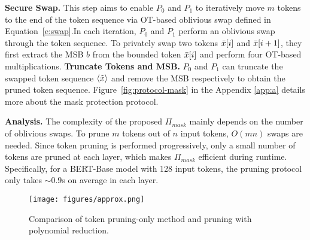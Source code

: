  \textbf{Secure Swap.}  This step aims to enable $P_0$ and $P_1$ to iteratively move $m$ tokens to the end of the token sequence via OT-based oblivious swap defined in Equation~\ref{e:swap}.In each iteration, $P_0$ and $P_1$ perform an oblivious swap through the token sequence. To privately swap two tokens $\Bar{x}[i]$ and $\Bar{x}[i+1]$, they first extract the MSB $b$ from the bounded token $\Bar{x}[i]$ and perform four OT-based multiplications.  \textbf{Truncate Tokens and MSB.} $P_0$ and $P_1$ can truncate the swapped token sequence $\left \langle \Tilde{x} \right \rangle$ and remove the MSB respectively to obtain the pruned token sequence. Figure~\ref{fig:protocol-mask} in the Appendix \ref{app:a} details more about the mask protection protocol. 

\textbf{Analysis.} The complexity of the proposed $\Pi_{mask}$ mainly depends on the number of oblivious swaps. To prune $m$ tokens out of $n$ input tokens, $O(mn)$ swaps are needed. Since token pruning is performed progressively, only a small number of tokens are pruned at each layer, which makes $\Pi_{mask}$ efficient during runtime. Specifically, for a BERT-Base model with 128 input tokens, the pruning protocol only takes $\sim0.9$s on average in each layer. %

\begin{figure*}[h]
 \vspace{-0.1in}
    \centering
    \texttt{[image: figures/approx.png]}
    \captionsetup{skip=2pt}
    \caption{Comparison of token pruning-only method and pruning with polynomial reduction.}
    \label{fig:approx}
    \vspace{-0.2in}
\end{figure*}

